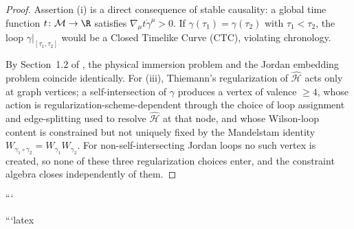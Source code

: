 \begin{proof}
Assertion (i) is a direct consequence of stable causality: a global time function $t \colon \mathcal{M} \to \R$ satisfies $\nabla_\mu t \dot{\gamma}^\mu > 0$. If $\gamma(\tau_1) = \gamma(\tau_2)$ with $\tau_1 < \tau_2$, the loop $\gamma|_{[\tau_1, \tau_2]}$ would be a Closed Timelike Curve (CTC), violating chronology.

By Section~1.2 of \cite{silvafilho2026noneuclidean}, the physical immersion problem and the Jordan embedding problem coincide identically. For (iii), Thiemann's regularization of $\widehat{\mathcal{H}}$ acts only at graph vertices; a self-intersection of $\gamma$ produces a vertex of valence $\ge 4$, whose action is regularization-scheme-dependent through the choice of loop assignment and edge-splitting used to resolve $\widehat{\mathcal{H}}$ at that node, and whose Wilson-loop content is constrained but not uniquely fixed by the Mandelstam identity $W_{\gamma_1 \circ \gamma_2} = W_{\gamma_1} W_{\gamma_2}$. For non-self-intersecting Jordan loops no such vertex is created, so none of these three regularization choices enter, and the constraint algebra closes independently of them.
\end{proof}
```

```latex
